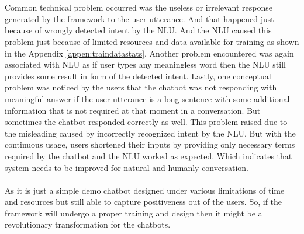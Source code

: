 \\~\\
Common technical problem occurred was the useless or irrelevant response generated by the framework to the user utterance. And that happened just because of wrongly detected intent by the NLU. And the NLU caused this problem just because of limited resources and data available for training as shown in the Appendix \ref{appen:traindatastats}. Another problem encountered was again associated with NLU as if user types any meaningless word then the NLU still provides some result in form of the detected intent. Lastly, one conceptual problem was noticed by the users that the chatbot was not responding with meaningful answer if the user utterance is a long sentence with some additional information that is not required at that moment in a conversation. But sometimes the chatbot responded correctly as well. This problem raised due to the misleading caused by incorrectly recognized intent by the NLU. But with the continuous usage, users shortened their inputs by providing only necessary terms required by the chatbot and the NLU worked as expected. Which indicates that system needs to be improved for natural and humanly conversation.
\\~\\
As it is just a simple demo chatbot designed under various limitations of time and resources but still able to capture positiveness out of the users. So, if the framework will undergo a proper training and design then it might be a revolutionary transformation for the chatbots.

